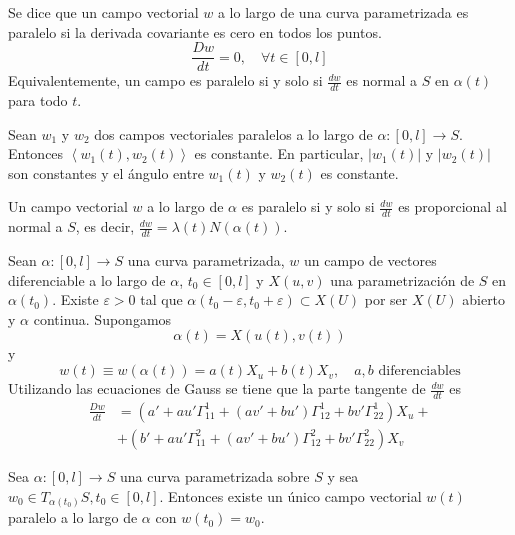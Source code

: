 \begin{definition}
    Se dice que un campo vectorial $w$ a lo largo de una curva parametrizada es paralelo si la derivada covariante es cero en todos los puntos.
    $$\frac{Dw}{dt} = 0, \quad \forall t \in [0, l]$$
    Equivalentemente, un campo es paralelo si y solo si $\frac{dw}{dt}$ es normal a $S$ en $\alpha(t)$ para todo $t$.
\end{definition}

\begin{proposition}
    Sean $w_1$ y $w_2$ dos campos vectoriales paralelos a lo largo de $\alpha : [0, l] \to S$.
    Entonces $\left\langle w_1(t), w_2(t) \right\rangle$ es constante.
    En particular, $|w_1(t)|$ y $|w_2(t)|$ son constantes y el ángulo entre $w_1(t)$ y $w_2(t)$ es constante.
\end{proposition}

\begin{note}
    Un campo vectorial $w$ a lo largo de $\alpha$ es paralelo si y solo si $\frac{dw}{dt}$ es proporcional al normal a $S$, es decir, $\frac{dw}{dt} = \lambda(t) N(\alpha(t))$.
\end{note}

\begin{proposition}
    Sean $\alpha : [0, l] \to S$ una curva parametrizada, $w$ un campo de vectores diferenciable a lo largo de $\alpha$, $t_0 \in [0, l]$ y $X(u, v)$ una parametrización de $S$ en $\alpha(t_0)$.
    Existe $\varepsilon>0$ tal que $\alpha(t_0-\varepsilon, t_0+\varepsilon) \subset X(U)$ por ser $X(U)$ abierto y $\alpha$ continua. Supongamos
    $$\alpha(t) = X(u(t), v(t))$$ y $$w(t) \equiv w(\alpha(t)) = a(t)X_u + b(t)X_v, \quad a, b \text{ diferenciables}$$
    Utilizando las ecuaciones de Gauss se tiene que la parte tangente de $\frac{dw}{dt}$ es
    \begin{align*}
        \frac{Dw}{dt} & = (a' + au'\Gamma^1_{11} + (av' + bu')\Gamma^1_{12} + bv'\Gamma^1_{22}) X_u + \\
                      & + (b' + au'\Gamma^2_{11} + (av' + bu')\Gamma^2_{12} + bv'\Gamma^2_{22}) X_v
    \end{align*}
\end{proposition}

\begin{proposition}
    Sea $\alpha : [0, l] \to S$ una curva parametrizada sobre $S$ y sea $w_0 \in T_{\alpha(t_0)}S, t_0 \in [0, l]$.
    Entonces existe un único campo vectorial $w(t)$ paralelo a lo largo de $\alpha$ con $w(t_0) = w_0$.
\end{proposition}

